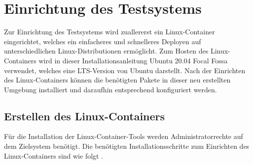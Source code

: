 \section{Einrichtung des Testsystems}\label{appendix1:Einrichtung_des_Testsystems}
Zur Einrichtung des Testsystems wird zuallererst ein Linux-Container eingerichtet, welches ein einfacheres und schnelleres Deployen auf unterschiedlichen Linux-Distributionen ermöglicht. Zum Hosten des Linux-Containers wird in dieser Installationsanleitung Ubuntu 20.04 Focal Fossa verwendet, welches eine LTS-Version von Ubuntu darstellt. Nach der Einrichten des Linux-Containers können die benötigten Pakete in dieser neu erstellten Umgebung installiert und daraufhin entsprechend konfiguriert werden.

\subsection{Erstellen des Linux-Containers}
Für die Installation der Linux-Container-Tools werden Administratorrechte auf dem Zielsystem benötigt. Die benötigten Installationsschritte zum Einrichten des Linux-Containers sind wie folgt \cite{lxd_blog_nodate}.


